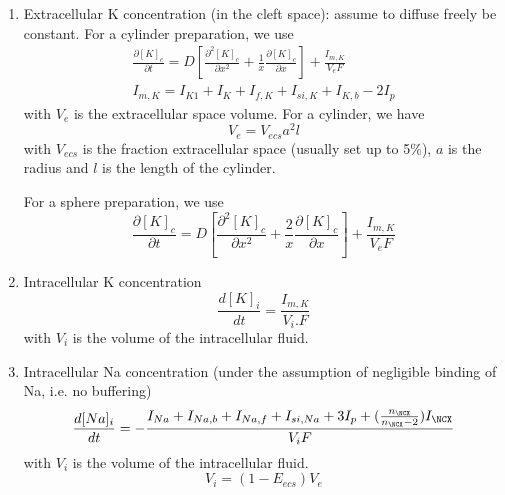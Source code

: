 \begin{enumerate}
\item Extracellular K concentration (in the cleft space): assume to
  diffuse freely be constant. For a cylinder preparation, we use
  \begin{equation}
    \label{eq:715}
    \begin{split}
      \frac{\partial [K]_c}{\partial t} = D\left[
        \frac{\partial^2[K]_c}{\partial x^2} + \frac{1}{x} \frac{\partial
          [K]_c}{\partial x}\right] + \frac{I_{m,K}}{V_eF} \\
      I_{m,K} = I_{K1} + I_{K} + I_{f,K} + I_{si,K} + I_{K,b} - 2I_p
    \end{split}
  \end{equation}
  with $V_e$ is the extracellular space volume. For a cylinder, we
  have
  \begin{equation}
    \label{eq:733}
    V_e = V_{ecs}a^2l 
  \end{equation}
with $V_{ecs}$ is the fraction extracellular space (usually set up to
5\%), $a$ is the radius and $l$ is the length of the cylinder. 


For a sphere preparation, we use
\begin{equation}
  \label{eq:735}
    \frac{\partial [K]_c}{\partial t} = D\left[
      \frac{\partial^2[K]_c}{\partial x^2} + \frac{2}{x} \frac{\partial
        [K]_c}{\partial x}\right] + \frac{I_{m,K}}{V_eF} 
\end{equation}
\item Intracellular K concentration
  \begin{equation}
    \label{eq:716}
    \frac{d[K]_i}{dt} = \frac{I_{m,K}}{V_i.F}
  \end{equation}
with $V_i$ is the volume of the intracellular fluid.

\item Intracellular Na concentration (under the assumption of
  negligible binding of Na, i.e. no buffering)
  \begin{equation}
    \label{eq:732}
    \frac{d[Na]_i}{dt} = -\frac{I_{Na}+I_{Na,b}+I_{Na,f}+I_{si,Na}+3I_p+(\frac{n_\NCX}{n_\NCX-2})I_\NCX}{V_iF}
  \end{equation}
with $V_i$ is the volume of the intracellular fluid.
\begin{equation}
  \label{eq:734}
  V_i = (1-E_{ecs})V_e
\end{equation}



\end{enumerate}
